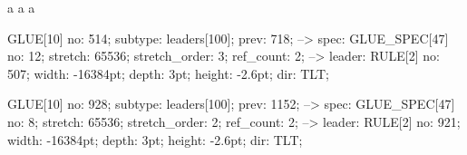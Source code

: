 \documentclass{article}
\begin{document}
\spaceskip=5cm

a a a

GLUE[10] no: 514; subtype: leaders[100]; prev: 718;
  --> spec: GLUE_SPEC[47] no: 12; stretch: 65536; stretch_order: 3; ref_count: 2;
  --> leader: RULE[2] no: 507; width: -16384pt; depth: 3pt; height: -2.6pt; dir: TLT;


GLUE[10] no: 928; subtype: leaders[100]; prev: 1152;
  --> spec: GLUE_SPEC[47] no: 8; stretch: 65536; stretch_order: 2; ref_count: 2;
  --> leader: RULE[2] no: 921; width: -16384pt; depth: 3pt; height: -2.6pt; dir: TLT;
\end{document}
